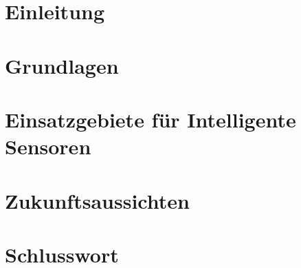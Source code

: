 \documentclass[a4paper,12pt]{scrartcl}
\begin{document}
\section{Einleitung}

\section{Grundlagen}


\section{Einsatzgebiete für Intelligente Sensoren}

\section{Zukunftsaussichten}

\section{Schlusswort}

\setcounter{page}{1}

\newpage



\clearpage

\end{document}
